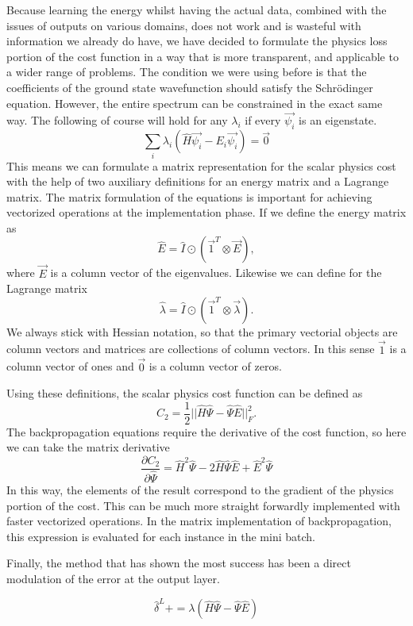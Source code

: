 Because learning the energy whilst having the actual data, combined with the
issues of outputs on various domains, does not work and is wasteful with
information we already do have, we have decided to formulate the physics loss
portion of the cost function in a way that is more transparent, and applicable
to a wider range of problems.  The condition we were using before is that the
coefficients of the ground state wavefunction should satisfy the
Schr\"{o}dinger equation.  However, the entire spectrum can be constrained in
the exact same way.  The following of course will hold for any $\lambda_i$ if
every $\vec{\psi_i}$ is an eigenstate. 
\begin{equation}
	\sum_i \lambda_i (\hat{H} \vec{\psi_i} - E_i \vec{\psi_i}) = \vec{0}
\end{equation}
This means we can formulate a matrix representation for the scalar 
physics cost with the help of two auxiliary definitions for an 
energy matrix and a Lagrange matrix. The matrix formulation of the 
equations is important for achieving vectorized operations at the 
implementation phase. If we define the energy matrix as
\begin{equation}
	\hat{E} = \hat{I} \odot (\vec{1}^T \otimes \vec{E}),
\end{equation}
where $\vec{E}$ is a column vector of the eigenvalues. Likewise 
we can define for the Lagrange matrix 
\begin{equation}
	\hat{\lambda} = \hat{I} \odot (\vec{1}^T \otimes \vec{\lambda}).
\end{equation}
We always stick with Hessian notation, so that the primary vectorial 
objects are column vectors and matrices are collections of column 
vectors. In this sense $\vec{1}$ is a column vector of ones and $\vec{0}$
is a column vector of zeros. 

Using these definitions, the scalar physics cost function can be defined as
\begin{equation}
	C_2 = \frac{1}{2} || \hat{H} \hat{\Psi} - \hat{\Psi}\hat{E} ||^2_F.
\end{equation}
The backpropagation equations require the derivative of the cost function, so here we 
can take the matrix derivative 
\begin{equation}
	\frac{\partial C_2}{ \partial \hat{\Psi}} = 
	\hat{H}^2 \hat{\Psi} - 2 \hat{H} \hat{\Psi} \hat{E} + \hat{E}^2 \hat{\Psi}
\end{equation}
In this way, the elements of the result correspond to the gradient of the
physics portion of the cost. This can be much more straight forwardly
implemented with faster vectorized operations. In the matrix implementation of
backpropagation, this expression is evaluated for each instance in the mini
batch.

Finally, the method that has shown the most success has been a direct modulation of the error 
at the output layer.

\begin{equation}
	\hat{\delta}^L += \lambda ( \hat{H} \hat{\Psi} - \hat{\Psi} \hat{E} ) 
\end{equation}
